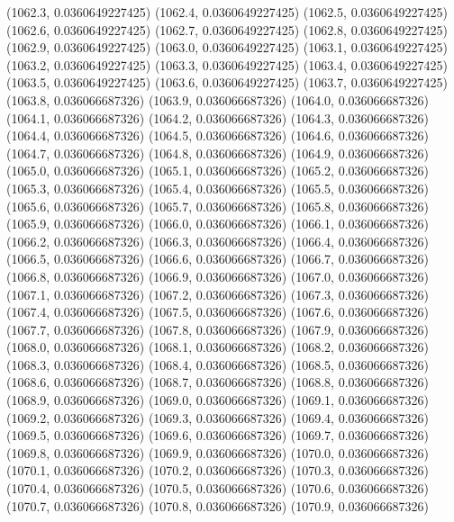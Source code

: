 {					(1062.3, 0.0360649227425)
					(1062.4, 0.0360649227425)
					(1062.5, 0.0360649227425)
					(1062.6, 0.0360649227425)
					(1062.7, 0.0360649227425)
					(1062.8, 0.0360649227425)
					(1062.9, 0.0360649227425)
					(1063.0, 0.0360649227425)
					(1063.1, 0.0360649227425)
					(1063.2, 0.0360649227425)
					(1063.3, 0.0360649227425)
					(1063.4, 0.0360649227425)
					(1063.5, 0.0360649227425)
					(1063.6, 0.0360649227425)
					(1063.7, 0.0360649227425)
					(1063.8, 0.036066687326)
					(1063.9, 0.036066687326)
					(1064.0, 0.036066687326)
					(1064.1, 0.036066687326)
					(1064.2, 0.036066687326)
					(1064.3, 0.036066687326)
					(1064.4, 0.036066687326)
					(1064.5, 0.036066687326)
					(1064.6, 0.036066687326)
					(1064.7, 0.036066687326)
					(1064.8, 0.036066687326)
					(1064.9, 0.036066687326)
					(1065.0, 0.036066687326)
					(1065.1, 0.036066687326)
					(1065.2, 0.036066687326)
					(1065.3, 0.036066687326)
					(1065.4, 0.036066687326)
					(1065.5, 0.036066687326)
					(1065.6, 0.036066687326)
					(1065.7, 0.036066687326)
					(1065.8, 0.036066687326)
					(1065.9, 0.036066687326)
					(1066.0, 0.036066687326)
					(1066.1, 0.036066687326)
					(1066.2, 0.036066687326)
					(1066.3, 0.036066687326)
					(1066.4, 0.036066687326)
					(1066.5, 0.036066687326)
					(1066.6, 0.036066687326)
					(1066.7, 0.036066687326)
					(1066.8, 0.036066687326)
					(1066.9, 0.036066687326)
					(1067.0, 0.036066687326)
					(1067.1, 0.036066687326)
					(1067.2, 0.036066687326)
					(1067.3, 0.036066687326)
					(1067.4, 0.036066687326)
					(1067.5, 0.036066687326)
					(1067.6, 0.036066687326)
					(1067.7, 0.036066687326)
					(1067.8, 0.036066687326)
					(1067.9, 0.036066687326)
					(1068.0, 0.036066687326)
					(1068.1, 0.036066687326)
					(1068.2, 0.036066687326)
					(1068.3, 0.036066687326)
					(1068.4, 0.036066687326)
					(1068.5, 0.036066687326)
					(1068.6, 0.036066687326)
					(1068.7, 0.036066687326)
					(1068.8, 0.036066687326)
					(1068.9, 0.036066687326)
					(1069.0, 0.036066687326)
					(1069.1, 0.036066687326)
					(1069.2, 0.036066687326)
					(1069.3, 0.036066687326)
					(1069.4, 0.036066687326)
					(1069.5, 0.036066687326)
					(1069.6, 0.036066687326)
					(1069.7, 0.036066687326)
					(1069.8, 0.036066687326)
					(1069.9, 0.036066687326)
					(1070.0, 0.036066687326)
					(1070.1, 0.036066687326)
					(1070.2, 0.036066687326)
					(1070.3, 0.036066687326)
					(1070.4, 0.036066687326)
					(1070.5, 0.036066687326)
					(1070.6, 0.036066687326)
					(1070.7, 0.036066687326)
					(1070.8, 0.036066687326)
					(1070.9, 0.036066687326)
}
